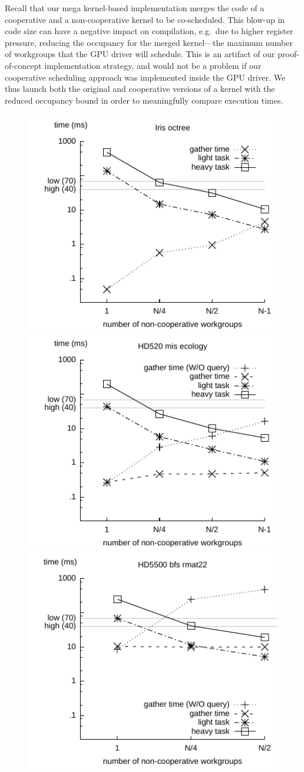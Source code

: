 \documentclass[parskip=half,sigconf,review, anonymous=true, acmcopyrightmode=none]{acmart}
\begin{document}
Recall that our mega kernel-based implementation merges the code of a
cooperative and a non-cooperative kernel to be co-scheduled.  This
blow-up in code size can have a negative impact on compilation, e.g.\
due to higher register pressure, reducing the occupancy for the merged
kernel---the maximum number of workgroups that the GPU driver will
schedule.  This is an artifact of our proof-of-concept implementation
strategy, and would not be a problem if our cooperative scheduling
approach was implemented inside the GPU driver.  We thus launch both the
original and cooperative versions of a kernel with the reduced occupancy
bound in order to meaningfully compare execution times.

\begin{figure}
\includegraphics[width=.67\columnwidth]{iris_octree_NA.pdf} 
\includegraphics[width=.67\columnwidth]{hd520_mis_ecology.pdf}
\includegraphics[width=.67\columnwidth]{hd5500_bfs_rmat22.pdf}

\end{figure}
\end{document}
